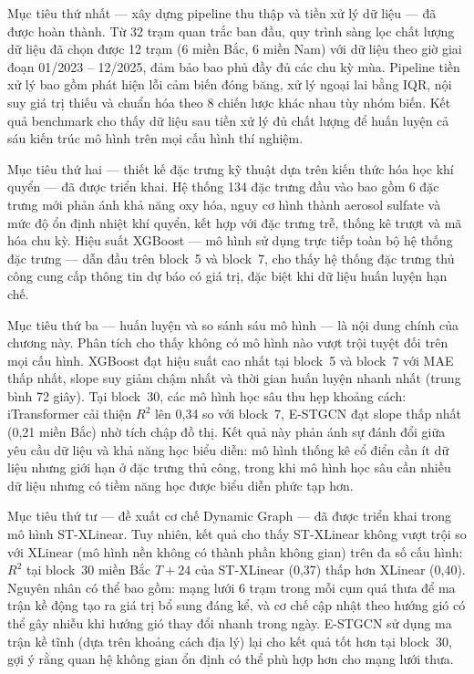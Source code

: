Mục tiêu thứ nhất --- xây dựng pipeline thu thập và tiền xử lý dữ liệu --- đã được hoàn thành. Từ 32 trạm quan trắc ban đầu, quy trình sàng lọc chất lượng dữ liệu đã chọn được 12 trạm (6 miền Bắc, 6 miền Nam) với dữ liệu theo giờ giai đoạn 01/2023 -- 12/2025, đảm bảo bao phủ đầy đủ các chu kỳ mùa. Pipeline tiền xử lý bao gồm phát hiện lỗi cảm biến đóng băng, xử lý ngoại lai bằng IQR, nội suy giá trị thiếu và chuẩn hóa theo 8 chiến lược khác nhau tùy nhóm biến. Kết quả benchmark cho thấy dữ liệu sau tiền xử lý đủ chất lượng để huấn luyện cả sáu kiến trúc mô hình trên mọi cấu hình thí nghiệm.

Mục tiêu thứ hai --- thiết kế đặc trưng kỹ thuật dựa trên kiến thức hóa học khí quyển --- đã được triển khai. Hệ thống 134 đặc trưng đầu vào bao gồm 6 đặc trưng mới phản ánh khả năng oxy hóa, nguy cơ hình thành aerosol sulfate và mức độ ổn định nhiệt khí quyển, kết hợp với đặc trưng trễ, thống kê trượt và mã hóa chu kỳ. Hiệu suất XGBoost --- mô hình sử dụng trực tiếp toàn bộ hệ thống đặc trưng --- dẫn đầu trên block~5 và block~7, cho thấy hệ thống đặc trưng thủ công cung cấp thông tin dự báo có giá trị, đặc biệt khi dữ liệu huấn luyện hạn chế.

Mục tiêu thứ ba --- huấn luyện và so sánh sáu mô hình --- là nội dung chính của chương này. Phân tích cho thấy không có mô hình nào vượt trội tuyệt đối trên mọi cấu hình. XGBoost đạt hiệu suất cao nhất tại block~5 và block~7 với MAE thấp nhất, slope suy giảm chậm nhất và thời gian huấn luyện nhanh nhất (trung bình 72 giây). Tại block~30, các mô hình học sâu thu hẹp khoảng cách: iTransformer cải thiện $R^2$ lên 0,34 so với block~7, E-STGCN đạt slope thấp nhất (0,21 miền Bắc) nhờ tích chập đồ thị. Kết quả này phản ánh sự đánh đổi giữa yêu cầu dữ liệu và khả năng học biểu diễn: mô hình thống kê cổ điển cần ít dữ liệu nhưng giới hạn ở đặc trưng thủ công, trong khi mô hình học sâu cần nhiều dữ liệu nhưng có tiềm năng học được biểu diễn phức tạp hơn.

Mục tiêu thứ tư --- đề xuất cơ chế Dynamic Graph --- đã được triển khai trong mô hình ST-XLinear. Tuy nhiên, kết quả cho thấy ST-XLinear không vượt trội so với XLinear (mô hình nền không có thành phần không gian) trên đa số cấu hình: $R^2$ tại block~30 miền Bắc $T{+}24$ của ST-XLinear (0,37) thấp hơn XLinear (0,40). Nguyên nhân có thể bao gồm: mạng lưới 6 trạm trong mỗi cụm quá thưa để ma trận kề động tạo ra giá trị bổ sung đáng kể, và cơ chế cập nhật theo hướng gió có thể gây nhiễu khi hướng gió thay đổi nhanh trong ngày. E-STGCN sử dụng ma trận kề tĩnh (dựa trên khoảng cách địa lý) lại cho kết quả tốt hơn tại block~30, gợi ý rằng quan hệ không gian ổn định có thể phù hợp hơn cho mạng lưới thưa.

